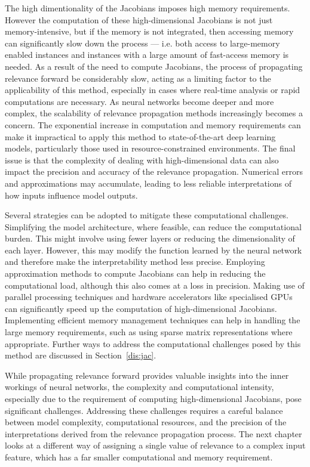 The high dimentionality of the Jacobians imposes high memory requirements. However the computation of these high-dimensional Jacobians is not just memory-intensive, but if the memory is not integrated, then accessing memory can significantly slow down the process --- i.e. both access to large-memory enabled instances and instances with a large amount of fast-access memory is needed. As a result of the need to compute Jacobians, the process of propagating relevance forward be considerably slow, acting as a limiting factor to the applicability of this method, especially in cases where real-time analysis or rapid computations are necessary. As neural networks become deeper and more complex, the scalability of relevance propagation methods increasingly becomes a concern. The exponential increase in computation and memory requirements can make it impractical to apply this method to state-of-the-art deep learning models, particularly those used in resource-constrained environments. The final issue is that the complexity of dealing with high-dimensional data can also impact the precision and accuracy of the relevance propagation. Numerical errors and approximations may accumulate, leading to less reliable interpretations of how inputs influence model outputs. 

Several strategies can be adopted to mitigate these computational challenges. Simplifying the model architecture, where feasible, can reduce the computational burden. This might involve using fewer layers or reducing the dimensionality of each layer. However, this may modify the function learned by the neural network and therefore make the interpretability method less precise. Employing approximation methods to compute Jacobians can help in reducing the computational load, although this also comes at a loss in precision. Making use of parallel processing techniques and hardware accelerators like specialised GPUs can significantly speed up the computation of high-dimensional Jacobians. Implementing efficient memory management techniques can help in handling the large memory requirements, such as using sparse matrix representations where appropriate. Further ways to address the computational challenges posed by this method are discussed in Section~\ref{dis:jac}.


While propagating relevance forward provides valuable insights into the inner workings of neural networks, the complexity and computational intensity, especially due to the requirement of computing high-dimensional Jacobians, pose significant challenges. Addressing these challenges requires a careful balance between model complexity, computational resources, and the precision of the interpretations derived from the relevance propagation process. The next chapter looks at a different way of assigning a single value of relevance to a complex input feature, which has a far smaller computational and memory requirement. 
